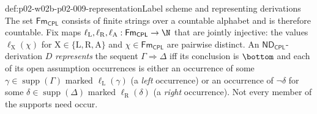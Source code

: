 \begin{hbdefinition}{def:p02-w02b-p02-009-representation}{Label scheme and representing derivations}
The set \(\mathsf{Fm}_{\mathsf{CPL}}\) consists of finite strings over a
countable alphabet and is therefore countable.  Fix maps
\(\ell_{\mathrm L},\ell_{\mathrm R},\ell_{\mathrm A}:
\mathsf{Fm}_{\mathsf{CPL}}\to\N\) that are jointly injective: the values
\(\ell_{\mathrm X}(\chi)\) for \(\mathrm X\in\{\mathrm L,\mathrm R,\mathrm A\}\)
and \(\chi\in\mathsf{Fm}_{\mathsf{CPL}}\) are pairwise distinct.  An
\(\mathsf{ND}_{\mathsf{CPL}}\)-derivation \(D\) \emph{represents} the
sequent \(\Gamma\Rightarrow\Delta\) iff its conclusion is \(\bottom\) and each
of its open assumption occurrences is either an occurrence of some
\(\gamma\in\operatorname{supp}(\Gamma)\) marked \(\ell_{\mathrm L}(\gamma)\)
(a \emph{left} occurrence) or an occurrence of \(\neg\delta\) for some
\(\delta\in\operatorname{supp}(\Delta)\) marked \(\ell_{\mathrm R}(\delta)\)
(a \emph{right} occurrence).  Not every member of the supports need occur.
\end{hbdefinition}

